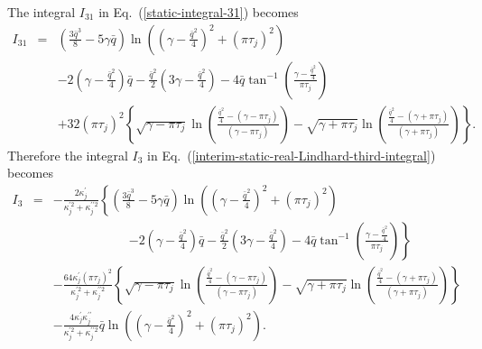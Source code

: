 \documentclass[aps,showkeys,noshowpacs,superscriptaddress,pre,preprint]{revtex4-2}
\begin{document}
The integral $I_{31}$ in Eq.~(\ref{static-integral-31}) becomes
\begin{eqnarray*}
I_{31} 
&=& \left( \frac{3 \bar{q}^3}{8} - 5 \gamma \bar{q} \right) \ln\left( \left( \gamma - \frac{\bar{q}^2}{4} \right)^2 + \left( \pi \tau_j \right)^2 \right)
\\
& & 
 - 2 \left( \gamma - \frac{\bar{q}^2}{4} \right) \bar{q} 
- \frac{\bar{q}^2}{2} \left( 3 \gamma - \frac{\bar{q}^2}{4} \right)
- 4 \bar{q} \tan^{-1}\left( \frac{\gamma - \frac{\bar{q}^2}{4}}{\pi \tau_j} \right)
\\
& &
+32 \left( \pi \tau_j \right)^2 
\left\{
\sqrt{\gamma - \pi \tau_j} \ln\left(
\frac{\frac{\bar{q}^2}{4} - \left( \gamma - \pi \tau_j \right)}{\left( \gamma - \pi \tau_j \right)}
\right)
- \sqrt{\gamma + \pi \tau_j} \ln\left(
\frac{\frac{\bar{q}^2}{4}  - \left( \gamma + \pi \tau_j \right)}{\left( \gamma + \pi \tau_j \right)}
\right)
\right\} .
\end{eqnarray*}
Therefore the integral $I_3$ in Eq.~(\ref{interim-static-real-Lindhard-third-integral}) becomes
\begin{eqnarray}
I_{3} &=&
- \frac{2 \kappa_j^\prime}{\kappa_j^{\prime 2} + \kappa_j^{\prime\prime 2}}
\left\{
\left( \frac{3 \bar{q}^3}{8} - 5 \gamma \bar{q} \right) \ln\left( \left( \gamma - \frac{\bar{q}^2}{4} \right)^2 + \left( \pi \tau_j \right)^2 \right)
\right.
\nonumber \\
& & \qquad \qquad \qquad \left.
 - 2 \left( \gamma - \frac{\bar{q}^2}{4} \right) \bar{q} 
- \frac{\bar{q}^2}{2} \left( 3 \gamma - \frac{\bar{q}^2}{4} \right)
- 4 \bar{q} \tan^{-1}\left( \frac{\gamma - \frac{\bar{q}^2}{4}}{\pi \tau_j} \right)
\right\}
\nonumber \\
& & 
- \frac{64 \kappa_j^\prime \left( \pi \tau_j \right)^2}{\kappa_j^{\prime 2} + \kappa_j^{\prime\prime 2}} 
\left\{
\sqrt{\gamma - \pi \tau_j} \ln\left(
\frac{\frac{\bar{q}^2}{4}  - \left( \gamma - \pi \tau_j \right)}{\left( \gamma - \pi \tau_j \right)}
\right)
- \sqrt{\gamma + \pi \tau_j} \ln\left(
\frac{\frac{\bar{q}^2}{4}  - \left( \gamma + \pi \tau_j \right)}{\left( \gamma + \pi \tau_j \right)}
\right)
\right\}
\nonumber \\
& &
- \frac{4 \kappa_j^\prime \kappa_j^{\prime\prime}}{\kappa_j^{\prime 2} + \kappa_j^{\prime\prime 2}}
\bar{q} \ln\left( \left( \gamma - \frac{\bar{q}^2}{4} \right)^2 + \left( \pi \tau_j \right)^2 \right) .
\end{eqnarray}
\end{document}
